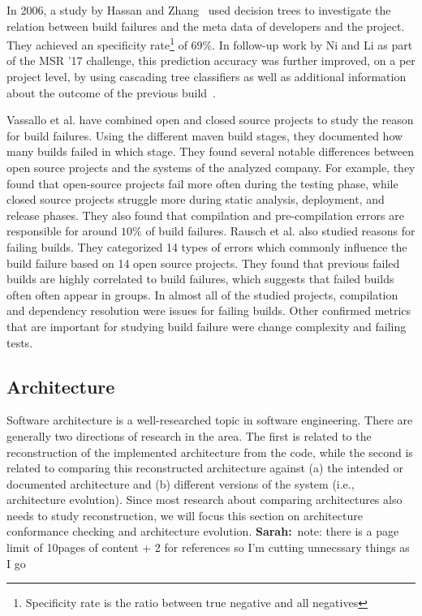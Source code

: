 \documentclass[sigplan, anonymous, review]{acmart}
\newcommand{\sn}[1]{{\color{blue}\textbf{Sarah:}~#1}}
\begin{document}
In 2006, a study by Hassan and Zhang~\cite{Pred-Tree} used decision trees to investigate the relation between build failures and the meta data of developers and the project.
They achieved an specificity rate\footnote{Specificity rate is the ratio between true negative and all negatives} of 69\%.
In follow-up work by Ni and Li as part of the MSR '17 challenge, this prediction accuracy was further improved, on a per project level, by using cascading tree classifiers as well as additional information about the outcome of the previous build~\cite{Pred-Cascade}. 

Vassallo et al. \cite{CIFailTypes} have combined open and closed source projects to study the reason for build failures. Using the different maven build stages, they documented how many builds failed in which stage. They found several notable differences between open source projects and the systems of the analyzed company. For example, they found that open-source projects fail more often during the testing phase, while closed source projects struggle more during static analysis, deployment, and release phases. They also found that compilation and pre-compilation errors are responsible for around $10\%$ of build failures.
Rausch et al. \cite{FailsinCIFlow} also studied reasons for failing builds. They categorized 14 types of errors which commonly influence the build failure based on 14 open source projects. They found that previous failed builds are highly correlated to build failures, which suggests that failed builds often often appear in groups. In almost all of the studied projects, compilation and dependency resolution were issues for failing builds. Other confirmed metrics that are important for studying build failure were change complexity and failing tests.

\subsection{Architecture}
\label{sec:relwork-arch}

Software architecture is a well-researched topic in software engineering.
There are generally two directions of research in the area.
The first is related to the reconstruction of the implemented architecture from the code, while the second is related to comparing this reconstructed architecture against (a) the intended or documented architecture and (b) different versions of the system (i.e., architecture evolution).
Since most research about comparing architectures also needs to study reconstruction, we will focus this section on architecture conformance checking and architecture evolution.
\sn{note: there is a page limit of 10pages of content + 2 for references so I'm cutting unnecssary things as I go}
\end{document}
